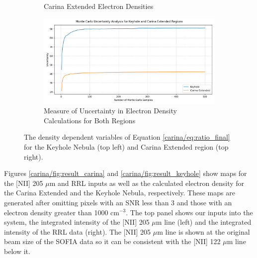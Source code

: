 \begin{figure}
\begin{subfigure}[t]{0.45\textwidth}
        \caption{Carina Extended Electron Densities}
        \label{carina/fig:calculations_carina}
    \end{subfigure}
    \begin{subfigure}[t]{\textwidth}
        \centering
        \includegraphics[width=\textwidth]{figs/carina/monte_carlo.png}
        \caption{Measure of Uncertainty in Electron Density Calculations for Both Regions}
        \label{carina/fig:monte_carlo}
    \end{subfigure}
    \caption[Density Dependent Variables for Electron Density Calculations and Monte Carlo Simulation]{
        The density dependent variables of Equation \ref{carina/eq:ratio_final} for the Keyhole Nebula (top left) and Carina Extended region (top right).
        }
    \label{carina/fig:calculations}
\end{figure}

Figures \ref{carina/fig:result_carina} and \ref{carina/fig:result_keyhole} show maps for the [NII] 205 $\mu$m and RRL inputs as well as the calculated electron density for the Carina Extended and the Keyhole Nebula, respectively.
These maps are generated after omitting pixels with an SNR less than 3 and those with an electron density greater than 1000 cm$^{-3}$.
The top panel shows our inputs into the system, the integrated intensity of the [NII] 205 $\mu$m line (left) and the integrated intensity of the RRL data (right).
The [NII] 205 $\mu$m line is shown at the original beam size of the SOFIA data so it can be consistent with the [NII] 122 $\mu$m line below it.

